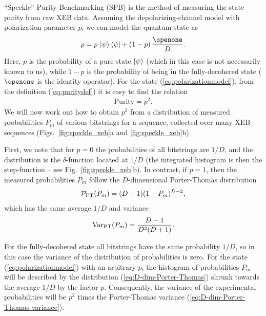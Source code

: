 “Speckle” Purity Benchmarking (SPB) is the method of measuring the state purity from raw XEB data. Assuming the depolarizing-channel model with polarization parameter $p$, we can model the quantum state as 
\begin{align}
  \label{eq:polarizationmodel}
  \rho = p \, \ket{\psi} \bra{\psi} + (1-p)\, \frac{\openone}{D}.
\end{align}
Here, $p$ is the probability of a pure state $\mathinner{|{\psi}\rangle}$ (which in this case is not necessarily known to us), while $1-p$ is the probability of being in the fully-decohered state ($\openone$ is the identity operator). For the state (\ref{eq:polarizationmodel}), from the definition (\ref{eq:puritydef}) it is easy to find the relation 
    \begin{align}
    \label{eq:purity-p-relation}
\textrm{Purity}=p^2. 
    \end{align}
We will now work out how to obtain $p^2$ from a distribution of measured probabilities $P_m$ of various bitstrings for a sequence, collected over many XEB sequences (Figs.\ \ref{fig:speckle_xeb}a and \ref{fig:speckle_xeb}b). 

First, we note that for $p=0$ the probabilities of all bitstrings are $1/D$, and the distribution is the $\delta$-function located at $1/D$ (the integrated histogram is then the step-function -- see Fig.\ \ref{fig:speckle_xeb}b). In contrast, if $p=1$, then the measured probabilities $P_m$ follow the $D$-dimensional Porter-Thomas distribution \cite{boixo2018characterizing}
    \begin{align}
    \label{eq:D-dim-Porter-Thomas}
    {\cal P}_{\rm PT}(P_m) = (D-1)(1-P_m)^{D-2},
    \end{align}
which has the same average $1/D$ and variance
    \begin{align}
     \label{eq:D-dim-Porter-Thomas-variance}
{\rm Var}_{\rm PT}(P_m)=\frac{D-1}{D^2(D+1)}.
    \end{align}

For the fully-decohered state all bitstrings have the same probability $1/D$, so in this case the variance of the distribution of probabilities is zero. For the state (\ref{eq:polarizationmodel}) with an arbitrary $p$, the histogram of probabilities $P_m$ will be described by the distribution (\ref{eq:D-dim-Porter-Thomas}) shrunk towards the average $1/D$ by the factor $p$. Consequently, the variance of the experimental probabilities will be $p^2$ times the Porter-Thomas variance (\ref{eq:D-dim-Porter-Thomas-variance}).

